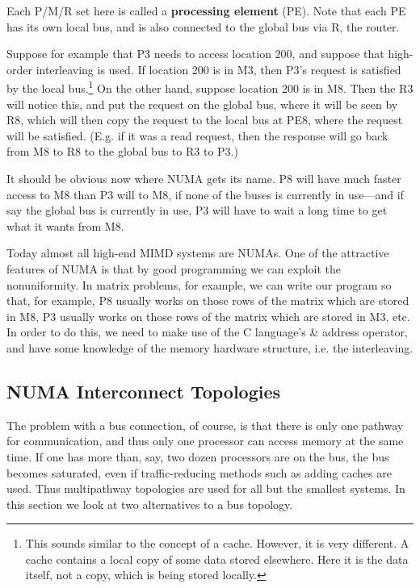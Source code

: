 Each P/M/R set here is called a \textbf{processing element} (PE). Note
that each PE has its own local bus, and is also connected to the global
bus via R, the router.

Suppose for example that P3 needs to access location 200, and suppose
that high-order interleaving is used.  If location 200 is in M3, then
P3's request is satisfied by the local bus.\footnote{This sounds similar
to the concept of a cache. However, it is very different.  A cache
contains a local copy of some data stored elsewhere.  Here it is the
data itself, not a copy, which is being stored locally.} On the other
hand, suppose location 200 is in M8. Then the R3 will notice this, and
put the request on the global bus, where it will be seen by R8, which
will then copy the request to the local bus at PE8, where the request
will be satisfied.  (E.g. if it was a read request, then the response
will go back from M8 to R8 to the global bus to R3 to P3.)

It should be obvious now where NUMA gets its name. P8 will have much
faster access to M8 than P3 will to M8, if none of the buses is
currently in use---and if say the global bus is currently in use, P3
will have to wait a long time to get what it wants from M8.

Today almost all high-end MIMD systems are NUMAs.  One of the attractive
features of NUMA is that by good programming we can exploit the
nonuniformity.  In matrix problems, for example, we can write our
program so that, for example, P8 usually works on those rows of the
matrix which are stored in M8, P3 usually works on those rows of the
matrix which are stored in M3, etc. In order to do this, we need to make
use of the C language's \& address operator, and have some knowledge of
the memory hardware structure, i.e. the interleaving.

\subsection{NUMA Interconnect Topologies}

The problem with a bus connection, of course, is that there is only one
pathway for communication, and thus only one processor can access memory
at the same time.  If one has more than, say, two dozen processors are
on the bus, the bus becomes saturated, even if traffic-reducing methods
such as adding caches are used. Thus multipathway topologies are used
for all but the smallest systems.  In this section we look at two
alternatives to a bus topology.

